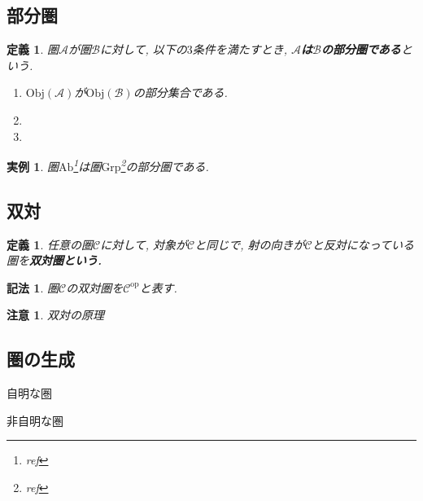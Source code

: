 \documentclass[dvipdfmx]{jsbook}
\theoremstyle{plain}
\newtheorem{Def}[thm]{定義}
\newtheorem{Notation}[thm]{記法}
\newtheorem{caution}[thm]{注意}
\newtheorem{example}[thm]{実例}
\begin{document}
\subsection{部分圏}
\begin{Def}
圏$\mathscr{A}$が圏$\mathscr{B}$に対して, 以下の$3$条件を満たすとき, {\bf $\mathscr{A}$は$\mathscr{B}$の部分圏である}という.
\begin{enumerate}
\item $\mathrm{Obj}(\mathscr{A})$が$\mathrm{Obj}(\mathscr{B})$の部分集合である.
\item
\item
\end{enumerate}
\end{Def}
\begin{example}
圏$\mathrm{Ab}$\footnote{ref}は圏$\mathrm{Grp}$\footnote{ref}の部分圏である.
\end{example}
\subsection{双対}
\begin{Def}
任意の圏$\mathscr{C}$に対して, 対象が$\mathscr{C}$と同じで, 射の向きが$\mathcal{C}$と反対になっている圏を\bf{双対圏}という.
\end{Def}
\begin{Notation}
圏$\mathscr{C}$の双対圏を$\mathscr{C}^{\mathrm{op}}$と表す.
\end{Notation}
\begin{caution}
双対の原理
\end{caution}
\subsection{圏の生成}
自明な圏

非自明な圏
\end{document}
